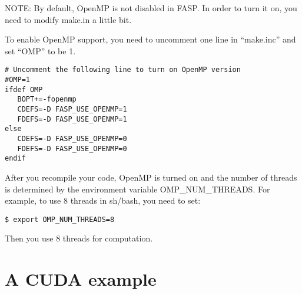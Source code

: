 \documentclass[11pt]{memoir}
\begin{document}
\begin{snugshade}\noindent
NOTE: By default, OpenMP is not disabled in FASP. In order to turn it on, you need to modify make.in a little bit.
\end{snugshade}

To enable OpenMP support, you need to uncomment one line in ``make.inc'' and set ``OMP'' to be 1.
\begin{lstlisting}[numbers=none]
# Uncomment the following line to turn on OpenMP version                                                                                                      
#OMP=1                                                                                                                                                        
ifdef OMP                                                                                                                                                     
   BOPT+=-fopenmp                                                                                                                                             
   CDEFS=-D FASP_USE_OPENMP=1                                                                                                                                 
   FDEFS=-D FASP_USE_OPENMP=1                                                                                                                                 
else                                                                                                                                                          
   CDEFS=-D FASP_USE_OPENMP=0                                                                                                                                 
   FDEFS=-D FASP_USE_OPENMP=0                                                                                                                                 
endif                                               
\end{lstlisting}

After you recompile your code, OpenMP is turned on and the number of threads is determined by the environment variable OMP\_NUM\_THREADS. For example, to use 8 threads in {\color{red} sh/bash}, you need to set:
\begin{lstlisting}[numbers=none]
$ export OMP_NUM_THREADS=8
\end{lstlisting}
Then you use 8 threads for computation. 

\section{A CUDA example}\label{sec:cuda}
\end{document}
